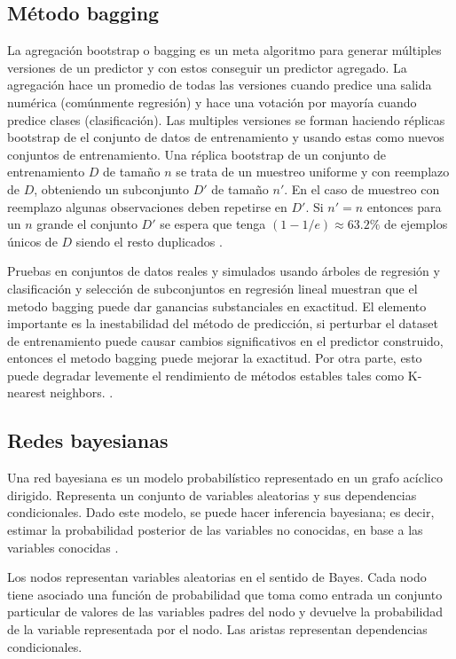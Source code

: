 \subsection{Método bagging}
La agregación bootstrap o bagging es un meta algoritmo para generar múltiples versiones de un predictor y con estos conseguir un predictor agregado. La agregación hace un promedio de todas las versiones cuando predice una salida numérica (comúnmente regresión) y hace una votación por mayoría cuando predice clases (clasificación).
Las multiples versiones se forman haciendo réplicas bootstrap de el conjunto de datos de entrenamiento y usando estas como nuevos conjuntos de entrenamiento.
Una réplica bootstrap de un conjunto de entrenamiento $D$ de tamaño $n$ se trata de un muestreo uniforme y con reemplazo de $D$, obteniendo un subconjunto $D'$ de tamaño $n'$. En el caso de muestreo con reemplazo algunas observaciones deben repetirse en $D'$. Si $n'=n$ entonces para un $n$ grande el conjunto $D'$ se espera que tenga $(1-1/e) \approx 63.2\%$ de ejemplos únicos de $D$ siendo el resto duplicados \cite{EstimatingtheSizeandConfidenceofaStatisticalAudit}.

Pruebas en conjuntos de datos reales y simulados usando árboles de regresión y clasificación y selección de subconjuntos en regresión lineal muestran que el metodo bagging puede dar ganancias substanciales en exactitud.
El elemento importante es la inestabilidad del método de predicción, si perturbar el dataset de entrenamiento puede causar cambios significativos en el predictor construido, entonces el metodo bagging puede mejorar la exactitud. Por otra parte, esto puede degradar levemente el rendimiento de métodos estables tales como K-nearest neighbors.
\cite{BreimanLMachineLearning1996}.

\subsection{Redes bayesianas}
Una red bayesiana es un modelo probabilístico representado en un grafo acíclico dirigido. Representa un conjunto de variables aleatorias y sus dependencias condicionales. Dado este modelo, se puede hacer inferencia bayesiana; es decir, estimar la probabilidad posterior de las variables no conocidas, en base a las variables conocidas \cite{LESucarChapter1RedesBayesianas}. 

Los nodos representan variables aleatorias en el sentido de Bayes. Cada nodo tiene asociado una función de probabilidad que toma como entrada un conjunto particular de valores de las variables padres del nodo y devuelve la probabilidad de la variable representada por el nodo. Las aristas representan dependencias condicionales.

